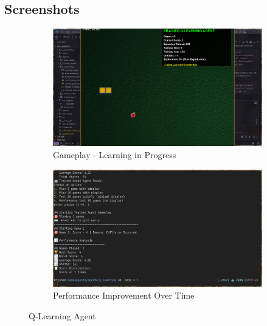 \documentclass[11pt,a4paper]{article}
\begin{document}
\subsection{Screenshots}
\begin{figure}[H]
    \centering
    \begin{subfigure}{0.45\textwidth}
        \includegraphics[width=\textwidth]{ss/learning_play.png}
        \caption{Gameplay - Learning in Progress}
    \end{subfigure}
    \hfill
    \begin{subfigure}{0.45\textwidth}
        \includegraphics[width=\textwidth]{ss/learning_score.png}
        \caption{Performance Improvement Over Time}
    \end{subfigure}
    \caption{Q-Learning Agent}
\end{figure}

\end{document}
